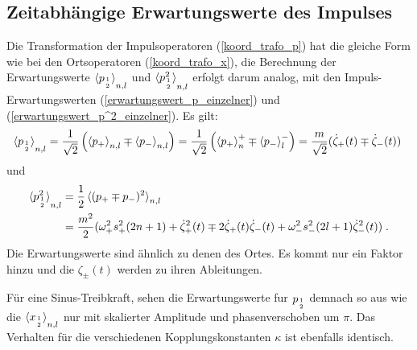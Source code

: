   \subsection{Zeitabhängige Erwartungswerte des Impulses}
    Die Transformation der Impulsoperatoren (\ref{koord_trafo_p}) hat die gleiche Form wie bei den Ortsoperatoren (\ref{koord_trafo_x}), die Berechnung der Erwartungswerte $\braket{p_{1 \atop 2}}_{n,l}$ und $\braket{p_{1\atop 2}^2}_{n,l}$ erfolgt darum analog, mit den Impuls-Erwartungswerten (\ref{erwartungswert_p_einzelner}) und (\ref{erwartungswert_p^2_einzelner}).
    Es gilt:
    \begin{align}
      \braket{p_{1 \atop 2}}_{n,l}=\frac{1}{\sqrt{2}}\left(\braket{p_+}_{n,l}\mp\braket{p_-}_{n,l}\right)
      =\frac{1}{\sqrt{2}}\left(\braket{p_+}_n^+\mp\braket{p_-}_l^-\right)
      =\frac{m}{\sqrt{2}}(\dot\zeta_+(t)\mp\dot\zeta_-(t)) \;
    \end{align}
    und
    \begin{align}
      \braket{p^2_{1\atop 2}}_{n,l}&=\frac{1}{2}\braket{(p_+\mp p_-)^2}_{n,l} \notag\\
      &=\frac {m^2} 2 (\omega_+^2s_+^2(2n+1)+\dot\zeta_+^2(t) \mp 2\dot\zeta_+(t)\dot\zeta_-(t) + \omega_-^2s_-^2(2l+1)\dot\zeta_-^2(t)) \; .
    \end{align}
    Die Erwartungswerte sind ähnlich zu denen des Ortes.
    Es kommt nur ein Faktor hinzu und die $\zeta_\pm(t)$ werden zu ihren Ableitungen.

    Für eine Sinus-Treibkraft, sehen die Erwartungswerte fur $p_{1\atop 2}$ demnach so aus wie die $\braket{x_{1\atop 2}}_{n,l}$ nur mit skalierter Amplitude und phasenverschoben um $\pi$.
    Das Verhalten für die verschiedenen Kopplungskonstanten $\kappa$ ist ebenfalls identisch.


